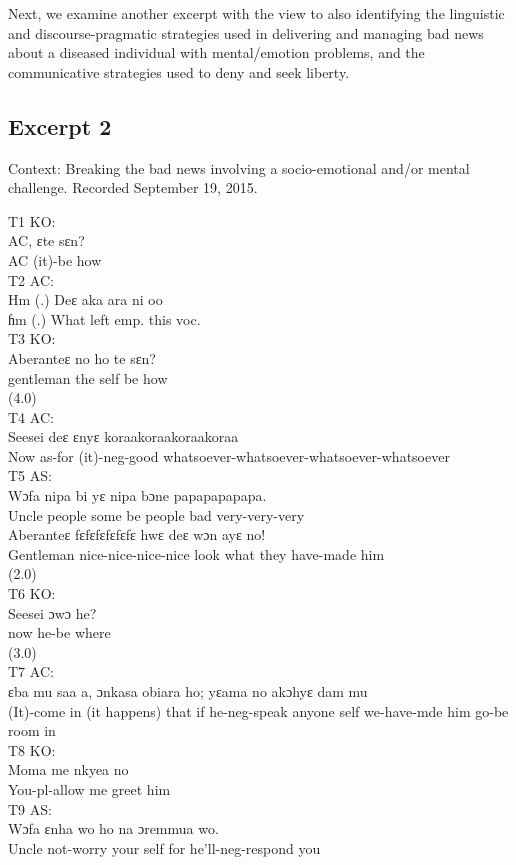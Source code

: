 \documentclass[output=paper,colorlinks,citecolor=brown]{langscibook}
\begin{document}
Next, we examine another excerpt with the view to also identifying the linguistic and discourse-pragmatic strategies used in delivering and managing bad news about a diseased individual with mental/emotion problems, and the communicative strategies used to deny and seek liberty.

\subsection{Excerpt 2}\label{sec:obeng:4.2}
Context: Breaking the bad news involving a socio-emotional and/or mental challenge. Recorded September 19, 2015.

\ea
    T1 KO:\\
    \gll    AC, ɛte sɛn?\\
            AC (it)-be how \\
\ex
    T2 AC:\\
    \gll    Hm (.) Deɛ aka ara ni oo \\
            ɦm (.) What left emp. this voc.\\
\ex
    T3 KO:\\ 
    \gll    Aberanteɛ no ho te sɛn? \\
            gentleman the self be how\\
            (4.0)\\
\ex
    T4 AC:\\
    \gll    Seesei deɛ ɛnyɛ koraakoraakoraakoraa \\
            Now as-for (it)-neg-good whatsoever-whatsoever-whatsoever-whatsoever\\
\ex
    T5 AS:\\
    \ea
    \gll    Wɔfa nipa bi yɛ nipa bɔne papapapapapa. \\
            Uncle people some be people bad very-very-very \\
    \ex
    \gll    Aberanteɛ fɛfɛfɛfɛfɛfɛ hwɛ deɛ wɔn ayɛ no! \\
            Gentleman nice-nice-nice-nice look what they have-made him \\
            (2.0)\\
    \z
\ex
    T6 KO:\\
    \gll    Seesei ɔwɔ he? \\
            now he-be where \\
            (3.0)\\
\ex
    T7 AC:\\
    \gll    ɛba mu saa a, ɔnkasa obiara ho; yɛama no akɔhyɛ dam mu \\
            (It)-come in (it happens) that if he-neg-speak anyone self we-have-mde him go-be room in \\
\ex
    T8 KO:\\
    \gll    Moma me nkyea no \\
            You-pl-allow me greet him \\
\ex
    T9 AS:\\
    \gll    Wɔfa ɛnha wo ho na ɔremmua wo. \\
            Uncle not-worry your self for he’ll-neg-respond you \\
\z
\end{document}
